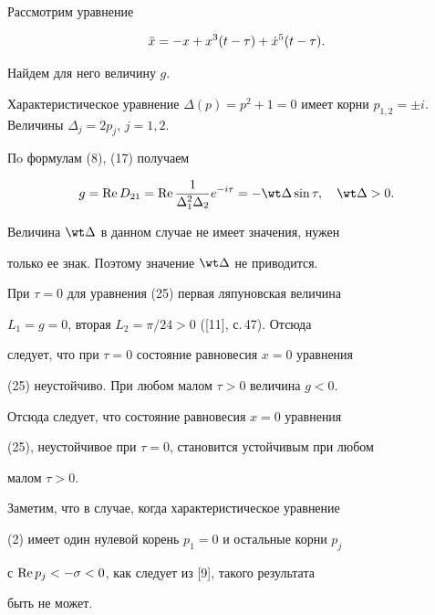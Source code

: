 \begin{exam} 


Рассмотрим уравнение 


\begin{equation} 


\Ddot x=-x+x^3(t-\tau)+\Dot x{}^5(t-\tau). 


\end{equation} 


Найдем для него величину $g$. 


Характеристическое уравнение $\Delta(p)=p^2+1=0$ имеет корни $p_{1,2}=\pm 


i$. Величины $\Delta_j=2p_j$, $j=1,2$. 


 


Пo формулам (8), (17) получаем 


$$ 


g=\re D_{21}=\re\frac{1}{\Delta^2_1\Delta_2} 


e^{-i\tau}=-\wt\Delta\sin\tau,\quad 


\wt\Delta>0.


$$ 


Величина $\wt\Delta$ в данном случае не имеет значения, нужен 


только ее знак. Поэтому значение $\wt\Delta$ не приводится. 


 


При $\tau=0$ для уравнения (25) первая ляпуновская величина 


$L_1=g=0$, вторая $L_2=\pi/24>0$ ([11], с.\,47). Отсюда 


следует, что при $\tau=0$ состояние равновесия $x=0$ уравнения 


(25) неустойчиво. При любом малом $\tau>0$ величина $g<0$. 


Отсюда следует, что состояние равновесия $x=0$ уравнения 


(25), неустойчивое при $\tau=0$, становится устойчивым при любом 


малом $\tau>0$. 


 


Заметим, что в случае, когда характеристическое уравнение 


(2) имеет один нулевой корень $p_1=0$ и остальные корни $p_j$ 


с $\operatorname{Re} p_j<-\sigma<0$, как следует из [9], такого результата 


быть не может. 


\end{exam} 


